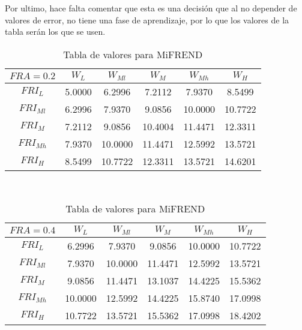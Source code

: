     Por ultimo, hace falta comentar que esta es una decisión que al no depender de valores de error, no tiene una fase de aprendizaje, por lo que los valores de la tabla serán los que se usen.
   
    
    
    
    
       \begin{table}[h]
    	\caption{Tabla de valores para MiFREND} \label{tab:betas1} 
    	\centering
    \footnotesize 
    	\begin{tabular}{|c||c|c|c|c|c|}
    		\hline
    		$FRA=0.2$	 &$W_L$&$W_{Ml}$&$W_M$&$W_{Mh}$&$W_H$\\
    		\hline  
    		\hline  
    		$FRI_L$&	 5.0000 &   6.2996 &   7.2112 & 7.9370 &  8.5499\\
    		
    		$FRI_{Ml}$&	6.2996  &  7.9370 &   9.0856 &  10.0000  & 10.7722\\
    		
    		$FRI_M$&	7.2112 &   9.0856 &  10.4004 &  11.4471 &  12.3311\\
    		
    		$FRI_{Mh}$&	7.9370 &  10.0000 &  11.4471 &  12.5992 &  13.5721\\
    		
    		$FRI_H$&	8.5499  & 10.7722 &  12.3311 &  13.5721 &  14.6201\\
    		\hline 
    	\end{tabular} \\
    	\bigskip
    	
    	
    	\begin{tabular}{|c||c|c|c|c|c|}
    		\hline
	   		$FRA=0.4$	 &$W_L$&$W_{Ml}$&$W_M$&$W_{Mh}$&$W_H$\\
    		\hline  
    		\hline  
    		$FRI_L$&6.2996&    7.9370  &  9.0856   &10.0000 &  10.7722\\
    		$FRI_{Ml}$&7.9370  & 10.0000 &  11.4471 &  12.5992 &  13.5721\\
    		$FRI_M$&9.0856  & 11.4471  & 13.1037 &  14.4225  & 15.5362\\
    		$FRI_{Mh}$&10.0000 &  12.5992  & 14.4225&   15.8740  & 17.0998\\
    		$FRI_H$&10.7722 &  13.5721  & 15.5362&   17.0998  & 18.4202\\
    		\hline 
    	\end{tabular} 
    	\bigskip
    	\\
    	

\end{table}
